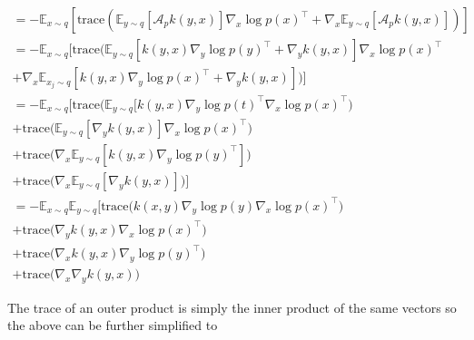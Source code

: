 \documentclass{article}
\begin{document}
\begin{gather}
         =  - \mathbb{E}_{x \sim q} \left[ 
                 \text{trace} \left( \mathbb{E}_{y \sim q} \left[ \mathcal{A}_p k(y,x) \right] \nabla_x \log p(x)^\top
                        + \nabla_x \mathbb{E}_{y \sim q } \left[ \mathcal{A}_p k(y, x) \right] \right) 
                \right] \\
        =  - \mathbb{E}_{x \sim q} \Big[ 
                     \text{trace}  \Big(
                      \mathbb{E}_{y\sim q} \left[ k(y,x) \nabla_y \log p(y)^\top 
                     + \nabla_y k(y,x) \right] \nabla_x \log p(x)^\top \\
               + \nabla_x \mathbb{E}_{x_j \sim q } \left[ 
                          k(y,x) \nabla_y \log p(x)^\top 
                          + \nabla_y k(y,x)
                      \right] 
              \Big) \Big] \\
        = - \mathbb{E}_{x \sim q} \Big[ 
             \text{trace} \Big( \mathbb{E}_{y \sim q} [ k(y,x) \nabla_y \log p(t)^\top \nabla_x \log p(x)^\top \Big) \\
             + \text{trace} \Big( \mathbb{E}_{y \sim q} [ \nabla_y  k(y,x) ] \nabla_x \log p(x)^\top \Big) \\
             + \text{trace} \Big( \nabla_x \mathbb{E}_{y \sim q} [ k(y,x) \nabla_y  \log p(y)^\top ] \Big) \\
             + \text{trace} \Big( \nabla_x \mathbb{E}_{y \sim q} [ \nabla_y  k(y,x)] \Big)
             \Big] \\
         = - \mathbb{E}_{x \sim q} \mathbb{E}_{y \sim q} \Big[
             \text{trace} \Big( k(x,y) \nabla_y \log p(y) \nabla_x \log p(x)^\top \Big) \\
             + \text{trace} \Big( \nabla_y  k(y,x) \nabla_x \log p(x)^\top \Big) \\
             + \text{trace} \Big( \nabla_x k(y,x) \nabla_y  \log p(y)^\top \Big) \\
             + \text{trace} \Big( \nabla_x \nabla_y  k(y,x) \Big) 
\end{gather}

The trace of an outer product is simply the inner product of the same vectors so the above can 
be further simplified to
\end{document}
